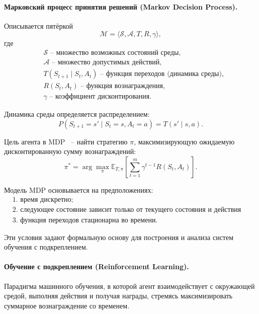 \paragraph{Марковский процесс принятия решений (Markov Decision Process).} Описывается пятёркой
\begin{equation}
\mathcal{M} = \langle \mathcal{S}, \mathcal{A}, T, R, \gamma \rangle,
\end{equation}
где
\begin{equation}
\begin{aligned}
& \mathcal{S}\text{~-- множество возможных состояний среды,}\\
&\mathcal{A} \text{~-- множество допустимых действий,}\\
&T(S_{t+1} \mid S_t, A_t) \text{~-- функция переходов (динамика среды),}\\
&R(S_t, A_t) \text{~-- функция вознаграждения,}\\
&\gamma \text{~-- коэффициент дисконтирования.}
\end{aligned}
\end{equation}

Динамика среды определяется распределением:
\begin{equation}
P(S_{t+1} = s' \mid S_t = s, A_t = a) = T(s' \mid s, a).
\end{equation}

Цель агента в MDP ~-- найти стратегию $\pi$, максимизирующую ожидаемую дисконтированную сумму вознаграждений:
\begin{equation}
\pi^* = \arg\max_{\pi} \mathbb{E}_{T,\pi}\!\left[\sum_{t=1}^{m} \gamma^{t-1} R(S_t, A_t)\right].
\end{equation}

Модель MDP основывается на предположениях:
\begin{equation}
\begin{aligned}
&\text{1. время дискретно;} \\
&\text{2. следующее состояние зависит только от текущего состояния и действия (свойство Маркова);} \\
&\text{3. функция переходов стационарна во времени.}
\end{aligned}
\end{equation}

Эти условия задают формальную основу для построения и анализа систем обучения с подкреплением.

\paragraph{Обучение с подкреплением (Reinforcement Learning).} Парадигма машинного обучения, в которой агент взаимодействует с окружающей средой, выполняя действия и получая награды, стремясь максимизировать суммарное вознаграждение со временем.

